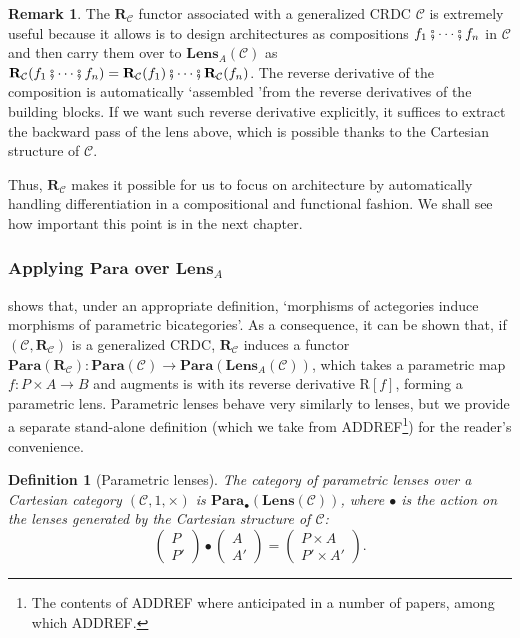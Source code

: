 \documentclass[12pt,a4paper,openright,twoside]{report}
\theoremstyle{plain}
\newtheorem{definition}[proposition]{Definition}
\theoremstyle{definition}
\newtheorem{remark}[proposition]{Remark}
\begin{document}
\begin{remark}
  \label{rem: Rcisuseful}
  The $\mathbf{R}_{\mathcal{C}}$ functor associated with a generalized CRDC $\mathcal{C}$ is extremely useful because it allows is to design architectures as compositions $f_1 \fatsemi \cdots \fatsemi f_n$ in $\mathcal{C}$ and then carry them over to $\mathbf{Lens}_A(\mathcal{C})$ as $\mathbf{R}_{\mathcal{C}}(f_1 \fatsemi \cdots \fatsemi f_n) = \mathbf{R}_{\mathcal{C}}(f_1) \fatsemi \cdots \fatsemi \mathbf{R}_{\mathcal{C}}(f_n)$.  The reverse derivative of the composition is automatically \lq assembled \rq from the reverse derivatives of the building blocks. If we want such reverse derivative explicitly, it suffices to extract the backward pass of the lens above, which is possible thanks to the Cartesian structure of $\mathcal{C}$.


  Thus, $\mathbf{R}_{\mathcal{C}}$ makes it possible for us to focus on architecture by automatically handling differentiation in a compositional and functional fashion. We shall see how important this point is in the next chapter.
\end{remark}





\subsubsection{Applying $\mathbf{Para}$ over $\mathbf{Lens}_A$}

\cite{gavranovic2024fundamental} shows that, under an appropriate definition, \lq morphisms of actegories induce morphisms of parametric bicategories\rq. As a consequence, it can be shown that, if  $(\mathcal{C}, \mathbf{R}_{\mathcal{C}})$ is a generalized CRDC,  $\mathbf{R}_{\mathcal{C}}$ induces a functor $\mathbf{Para}(\mathbf{R}_{\mathcal{C}}): \mathbf{Para}(\mathcal{C}) \to \mathbf{Para}(\mathbf{Lens}_A(\mathcal{C}))$, which takes a parametric map $f: P \times A \to B$ and augments is with its reverse derivative $\mathrm{R}[f]$, forming a parametric lens. Parametric lenses behave very similarly to lenses, but we provide a separate stand-alone definition (which we take from ADDREF\footnote{The contents of ADDREF where anticipated in a number of papers, among which ADDREF.}) for the reader's convenience.

\begin{definition}[Parametric lenses]
  The category of parametric lenses over a Cartesian category $(\mathcal{C},1,\times)$ is $\mathbf{Para}_{\bullet}(\mathbf{Lens}(\mathcal{C}))$, where $\bullet$ is the action on the lenses generated by the Cartesian structure of $\mathcal{C}$:
  \[\begin{pmatrix}
    P \\ P'
  \end{pmatrix} \bullet \begin{pmatrix}
    A \\ A'
  \end{pmatrix} = \begin{pmatrix}
    P \times A \\ P' \times A'
  \end{pmatrix}.\]
\end{definition}
\end{document}
